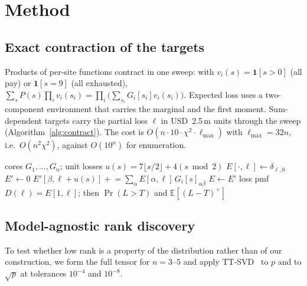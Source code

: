 \documentclass[conference]{IEEEtran}
\newcommand{\Ex}{\mathbb{E}}
\begin{document}
\section{Method}\label{sec:method}
\subsection{Exact contraction of the targets}
Products of per-site functions contract in one sweep: with $v_i(s)=\mathbf{1}[s>0]$ (all pay) or
$\mathbf{1}[s=9]$ (all exhausted), $\sum_sP(s)\prod_iv_i(s_i)=\prod_i\big(\sum_{s_i}G_i[s_i]v_i(s_i)\big)$. Expected loss
uses a two-component environment that carries the marginal and the first moment. Sum-dependent targets carry the
partial loss $\ell$ in USD~2.5\,m units through the sweep (Algorithm~\ref{alg:contract}). The cost is
$O(n\cdot10\cdot\chi^{2}\cdot\ell_{\max})$ with $\ell_{\max}=32n$, i.e.\ $O(n^{2}\chi^{2})$, against $O(10^{n})$
for enumeration.

\begin{algorithm}[t]
\caption{Exact loss distribution by MPS contraction}
\label{alg:contract}
\begin{algorithmic}[1]
\REQUIRE cores $G_1,\dots,G_n$; unit losses $u(s)=7\lfloor s/2\rfloor+4(s\bmod2)$
\STATE $E[\cdot,\ell]\leftarrow\delta_{\ell,0}$ 
  \STATE $E'\leftarrow0$
    \STATE $E'[\beta,\ell+u(s)]\mathrel{+}=\sum_\alpha E[\alpha,\ell]\,G_i[s]_{\alpha\beta}$
  \ENDFOR
  \STATE $E\leftarrow E'$
\ENDFOR
\RETURN loss pmf $D(\ell)=E[1,\ell]$; then $\Pr(L>T)$ and $\Ex[(L-T)^{+}]$
\end{algorithmic}
\end{algorithm}

\subsection{Model-agnostic rank discovery}
To test whether low rank is a property of the distribution rather than of our construction, we form the full
tensor for $n=3$--$5$ and apply TT-SVD~\cite{oseledets2011} to $p$ and to $\sqrt{p}$ at tolerances $10^{-4}$ and
$10^{-8}$.
\end{document}
